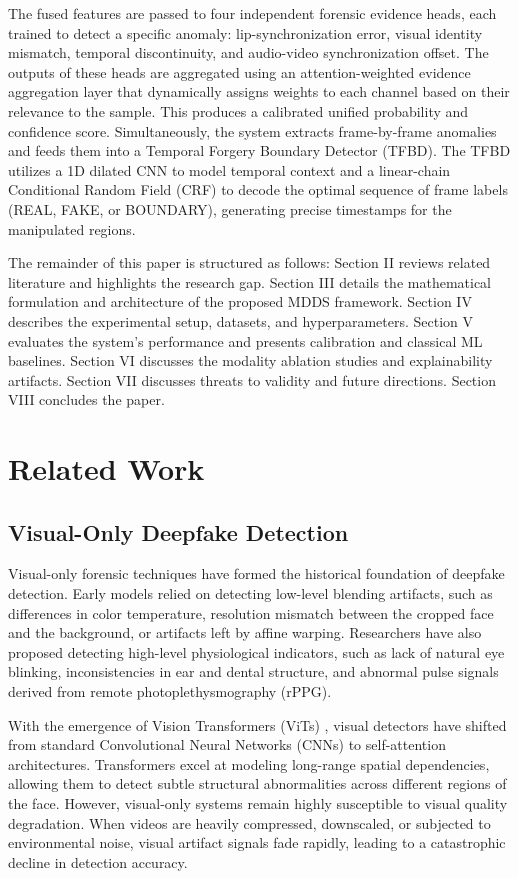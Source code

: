 \documentclass[journal,10pt,onecolumn,draftclsnofoot]{IEEEtran}
\begin{document}
The fused features are passed to four independent forensic evidence heads, each trained to detect a specific anomaly: lip-synchronization error, visual identity mismatch, temporal discontinuity, and audio-video synchronization offset. The outputs of these heads are aggregated using an attention-weighted evidence aggregation layer that dynamically assigns weights to each channel based on their relevance to the sample. This produces a calibrated unified probability and confidence score. Simultaneously, the system extracts frame-by-frame anomalies and feeds them into a Temporal Forgery Boundary Detector (TFBD). The TFBD utilizes a 1D dilated CNN to model temporal context and a linear-chain Conditional Random Field (CRF) to decode the optimal sequence of frame labels (REAL, FAKE, or BOUNDARY), generating precise timestamps for the manipulated regions.

The remainder of this paper is structured as follows: Section II reviews related literature and highlights the research gap. Section III details the mathematical formulation and architecture of the proposed MDDS framework. Section IV describes the experimental setup, datasets, and hyperparameters. Section V evaluates the system's performance and presents calibration and classical ML baselines. Section VI discusses the modality ablation studies and explainability artifacts. Section VII discusses threats to validity and future directions. Section VIII concludes the paper.

\section{Related Work}
\subsection{Visual-Only Deepfake Detection}
Visual-only forensic techniques have formed the historical foundation of deepfake detection. Early models relied on detecting low-level blending artifacts, such as differences in color temperature, resolution mismatch between the cropped face and the background, or artifacts left by affine warping. Researchers have also proposed detecting high-level physiological indicators, such as lack of natural eye blinking, inconsistencies in ear and dental structure, and abnormal pulse signals derived from remote photoplethysmography (rPPG). 

With the emergence of Vision Transformers (ViTs) \cite{dosovitskiy2021vit}, visual detectors have shifted from standard Convolutional Neural Networks (CNNs) to self-attention architectures. Transformers excel at modeling long-range spatial dependencies, allowing them to detect subtle structural abnormalities across different regions of the face. However, visual-only systems remain highly susceptible to visual quality degradation. When videos are heavily compressed, downscaled, or subjected to environmental noise, visual artifact signals fade rapidly, leading to a catastrophic decline in detection accuracy.
\end{document}
